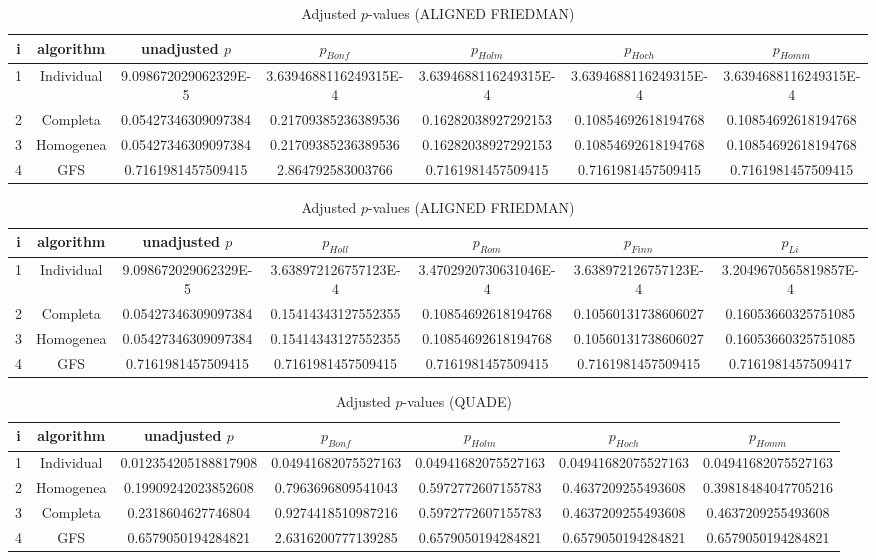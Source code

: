 \documentclass[a4paper,10pt]{article}
\begin{document}
\begin{landscape}
\begin{table}[!htp]
\centering\scriptsize
\caption{Adjusted $p$-values (ALIGNED FRIEDMAN)}
\begin{tabular}{ccccccc}
i&algorithm&unadjusted $p$&$p_{Bonf}$&$p_{Holm}$&$p_{Hoch}$&$p_{Homm}$\\
\hline
1&Individual&9.098672029062329E-5&3.6394688116249315E-4&3.6394688116249315E-4&3.6394688116249315E-4&3.6394688116249315E-4\\
2&Completa&0.05427346309097384&0.21709385236389536&0.16282038927292153&0.10854692618194768&0.10854692618194768\\
3&Homogenea&0.05427346309097384&0.21709385236389536&0.16282038927292153&0.10854692618194768&0.10854692618194768\\
4&GFS&0.7161981457509415&2.864792583003766&0.7161981457509415&0.7161981457509415&0.7161981457509415\\
\hline
\end{tabular}
\end{table}

\begin{table}[!htp]
\centering\scriptsize
\caption{Adjusted $p$-values (ALIGNED FRIEDMAN)}
\begin{tabular}{ccccccc}
i&algorithm&unadjusted $p$&$p_{Holl}$&$p_{Rom}$&$p_{Finn}$&$p_{Li}$\\
\hline
1&Individual&9.098672029062329E-5&3.638972126757123E-4&3.4702920730631046E-4&3.638972126757123E-4&3.2049670565819857E-4\\
2&Completa&0.05427346309097384&0.15414343127552355&0.10854692618194768&0.10560131738606027&0.16053660325751085\\
3&Homogenea&0.05427346309097384&0.15414343127552355&0.10854692618194768&0.10560131738606027&0.16053660325751085\\
4&GFS&0.7161981457509415&0.7161981457509415&0.7161981457509415&0.7161981457509415&0.7161981457509417\\
\hline
\end{tabular}
\end{table}


\newpage

\begin{table}[!htp]
\centering\scriptsize
\caption{Adjusted $p$-values (QUADE)}
\begin{tabular}{ccccccc}
i&algorithm&unadjusted $p$&$p_{Bonf}$&$p_{Holm}$&$p_{Hoch}$&$p_{Homm}$\\
\hline
1&Individual&0.012354205188817908&0.04941682075527163&0.04941682075527163&0.04941682075527163&0.04941682075527163\\
2&Homogenea&0.19909242023852608&0.7963696809541043&0.5972772607155783&0.4637209255493608&0.39818484047705216\\
3&Completa&0.2318604627746804&0.9274418510987216&0.5972772607155783&0.4637209255493608&0.4637209255493608\\
4&GFS&0.6579050194284821&2.6316200777139285&0.6579050194284821&0.6579050194284821&0.6579050194284821\\
\hline
\end{tabular}
\end{table}


\end{landscape}
\end{document}
